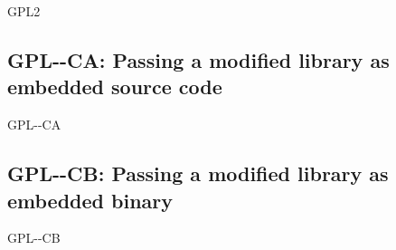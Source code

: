 \begin{license}{GPL2}
\subsection{GPL-\ver-CA: Passing a modified library as embedded source code}
\begin{lsuc}{GPL-\ver-CA}

  \useCaseA

  \begin{lsucrequires}
    \lsucmandatory{\keepLicenseElements}
    \lsucmandatory{\gpltwoEnsureCopyrightNoticeSource}
    \lsucmandatory{\giveLicense}\passingFilesCorrectly
    \lsucmandatory{\retainCopyrightNotices}
    \lsucmandatory{\addToCopyrightDialogLib}
    \lsucmandatory{\markEmbeddedModifications}
    \lsucmandatory{\arrangeEmbeddedChanges}\howToApplyTheseTerms
    \lsucmandatory{\arrangeEnclosingSources}
    \lsucoptional{\createChangelog}
    \lsucoptional{\addToDocumentation}
  \end{lsucrequires}

  \lsucprohibitsnothing
\end{lsuc}

\subsection{GPL-\ver-CB: Passing a modified library as embedded binary}
\begin{lsuc}{GPL-\ver-CB}

  \useCaseB

  \begin{lsucrequires}
    \lsucmandatory{\keepLicenseElements}
    \lsucmandatory{\gpltwoEnsureCopyrightNoticeBinary}
    \lsucmandatory{\giveLicense}\passingFilesCorrectly
    \lsucmandatory{\retainCopyrightNotices}
    \lsucmandatory{\makeAllSourcesAvailable}
    \lsucmandatory{\describeHowToGetSource}
    \lsucmandatory{\addToCopyrightDialogLib}
    \lsucmandatory{\markEmbeddedModifications}
    \lsucmandatory{\arrangeEmbeddedChanges}\howToApplyTheseTerms
    \lsucmandatory{\arrangeEnclosingBinaries}
    \lsucoptional{\createChangelog}
    \lsucoptional{\addToDocumentation}
  \end{lsucrequires}

  \lsucprohibitsnothing
\end{lsuc}

\end{license}

